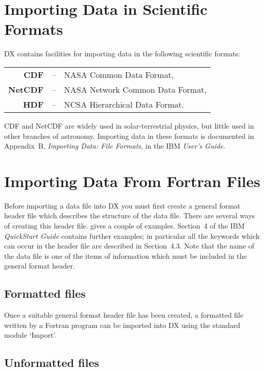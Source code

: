 \section{Importing Data in Scientific Formats  }

DX contains facilities for importing data in the following scientific
formats:

\begin{center}
\begin{tabular}{rcl}
{\bf CDF}    & -- & NASA Common Data Format,         \\
{\bf NetCDF} & -- & NASA Network Common Data Format, \\
{\bf HDF}    & -- & NCSA Hierarchical Data Format.   \\
\end{tabular}
\end{center}

CDF and NetCDF are widely used in solar-terrestrial physics, but little
used in other branches of astronomy. Importing data in these formats is
documented in Appendix~B, {\it Importing Data: File Formats}, in the IBM
{\it User's Guide}\cite{USERG}.


\section{Importing Data From Fortran Files  }

Before importing a data file into DX you must first create a general
format header file which describes the structure of the data file.
There are several ways of creating this header file.
\cite{SC2}
gives a couple of examples. Section~4 of the IBM {\it
QuickStart Guide}\cite{QUICKS} contains further examples; in particular
all the keywords which can occur in the header file are described in
Section~4.3. Note that the name of the data file is one of the items of
information which must be included in the general format header.


\subsection{Formatted files}

Once a suitable general format header file has been created, a formatted
file written by a Fortran program can be imported into DX using the
standard module `Import'.

\subsection{Unformatted files}

